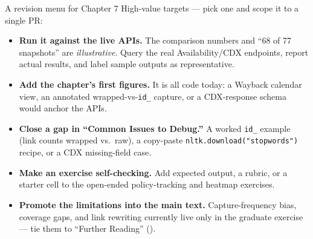\documentclass[9pt,aspectratio=169]{beamer}
\begin{document}
\begin{frame}{A revision menu for Chapter 7}
    High-value targets --- pick one and scope it to a single PR:
    \begin{itemize}
        \item \textbf{Run it against the live APIs.} The comparison numbers and ``68 of 77 snapshots'' are \textit{illustrative}. Query the real Availability/CDX endpoints, report actual results, and label sample outputs as representative.
        \item \textbf{Add the chapter's first figures.} It is all code today: a Wayback calendar view, an annotated wrapped-vs-\texttt{id\_} capture, or a CDX-response schema would anchor the APIs.
        \item \textbf{Close a gap in ``Common Issues to Debug.''} A worked \texttt{id\_} example (link counts wrapped vs.\ raw), a copy-paste \texttt{nltk.download("stopwords")} recipe, or a CDX missing-field case.
        \item \textbf{Make an exercise self-checking.} Add expected output, a rubric, or a starter cell to the open-ended policy-tracking and heatmap exercises.
        \item \textbf{Promote the limitations into the main text.} Capture-frequency bias, coverage gaps, and link rewriting currently live only in the graduate exercise --- tie them to ``Further Reading'' (\textcite{brugger_SAGEHandbookWeb_2018}).
    \end{itemize}
\end{frame}
\end{document}

